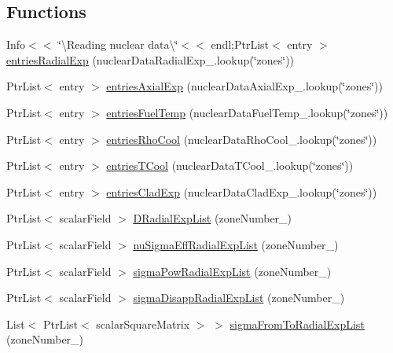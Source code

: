 \subsection*{Functions}
\begin{DoxyCompactItemize}
\item 
Info$<$$<$ \char`\"{}\textbackslash{}Reading nuclear data\textbackslash{}\char`\"{}$<$$<$ endl;Ptr\+List$<$ entry $>$ \hyperlink{readNuclearData_8H_a2ff34dd7194bd524d2933785fbe98bcf}{entries\+Radial\+Exp} (nuclear\+Data\+Radial\+Exp\+\_\+.\+lookup(\char`\"{}zones\char`\"{}))
\item 
Ptr\+List$<$ entry $>$ \hyperlink{readNuclearData_8H_a795fc32dd0463f6b0b02e228f1c96dd2}{entries\+Axial\+Exp} (nuclear\+Data\+Axial\+Exp\+\_\+.\+lookup(\char`\"{}zones\char`\"{}))
\item 
Ptr\+List$<$ entry $>$ \hyperlink{readNuclearData_8H_a128f8eba1518fa54aad20b070fa561cc}{entries\+Fuel\+Temp} (nuclear\+Data\+Fuel\+Temp\+\_\+.\+lookup(\char`\"{}zones\char`\"{}))
\item 
Ptr\+List$<$ entry $>$ \hyperlink{readNuclearData_8H_a85e4dec42ca9ccc7a9cb48f3c830dbc4}{entries\+Rho\+Cool} (nuclear\+Data\+Rho\+Cool\+\_\+.\+lookup(\char`\"{}zones\char`\"{}))
\item 
Ptr\+List$<$ entry $>$ \hyperlink{readNuclearData_8H_aa62f43acbd1ed45559c9e5841cd95ea5}{entries\+T\+Cool} (nuclear\+Data\+T\+Cool\+\_\+.\+lookup(\char`\"{}zones\char`\"{}))
\item 
Ptr\+List$<$ entry $>$ \hyperlink{readNuclearData_8H_a7100b54a6f8c2d3c497136e21bc12af5}{entries\+Clad\+Exp} (nuclear\+Data\+Clad\+Exp\+\_\+.\+lookup(\char`\"{}zones\char`\"{}))
\item 
Ptr\+List$<$ scalar\+Field $>$ \hyperlink{readNuclearData_8H_ae1060a118e4267dea408a4086efa6572}{D\+Radial\+Exp\+List} (zone\+Number\+\_\+)
\item 
Ptr\+List$<$ scalar\+Field $>$ \hyperlink{readNuclearData_8H_a7df4fdff4b73ed38eede469ff0df38f4}{nu\+Sigma\+Eff\+Radial\+Exp\+List} (zone\+Number\+\_\+)
\item 
Ptr\+List$<$ scalar\+Field $>$ \hyperlink{readNuclearData_8H_a808729e10cae93aa2cad2f4406e26325}{sigma\+Pow\+Radial\+Exp\+List} (zone\+Number\+\_\+)
\item 
Ptr\+List$<$ scalar\+Field $>$ \hyperlink{readNuclearData_8H_ac3eddb59ac5141fd0409196a9f65766a}{sigma\+Disapp\+Radial\+Exp\+List} (zone\+Number\+\_\+)
\item 
List$<$ Ptr\+List$<$ scalar\+Square\+Matrix $>$ $>$ \hyperlink{readNuclearData_8H_a784cd7b5c041a0f0734e85f81e68caa3}{sigma\+From\+To\+Radial\+Exp\+List} (zone\+Number\+\_\+)

\end{DoxyCompactItemize}
